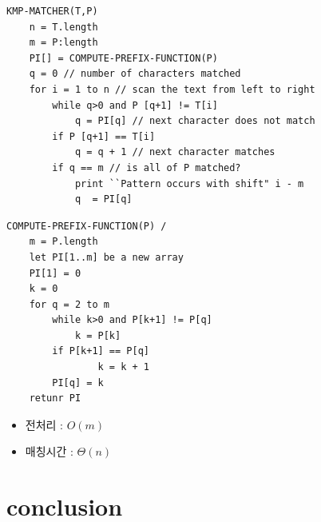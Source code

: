 \documentclass[10pt]{beamer}
\begin{document}
\begin{frame}[fragile]
\begin{lstlisting}[style = CStyle]
KMP-MATCHER(T,P)
    n = T.length
    m = P:length
    PI[] = COMPUTE-PREFIX-FUNCTION(P)
    q = 0 // number of characters matched
    for i = 1 to n // scan the text from left to right
        while q>0 and P [q+1] != T[i]
            q = PI[q] // next character does not match  
        if P [q+1] == T[i]
            q = q + 1 // next character matches
        if q == m // is all of P matched?
            print ``Pattern occurs with shift" i - m
            q  = PI[q]
\end{lstlisting}
\end{frame}




\begin{frame}[fragile]
\begin{lstlisting}[style = CStyle]
COMPUTE-PREFIX-FUNCTION(P) /
    m = P.length
    let PI[1..m] be a new array
    PI[1] = 0
    k = 0
    for q = 2 to m
        while k>0 and P[k+1] != P[q]
            k = P[k]
        if P[k+1] == P[q]
                k = k + 1
        PI[q] = k 
    retunr PI
\end{lstlisting}

\end{frame}



\begin{frame}
    \begin{itemize}
        \item 전처리 : $O(m)$
        \item 매칭시간 : $\Theta(n)$
    \end{itemize}
\end{frame}


\section{conclusion}
\end{document}
